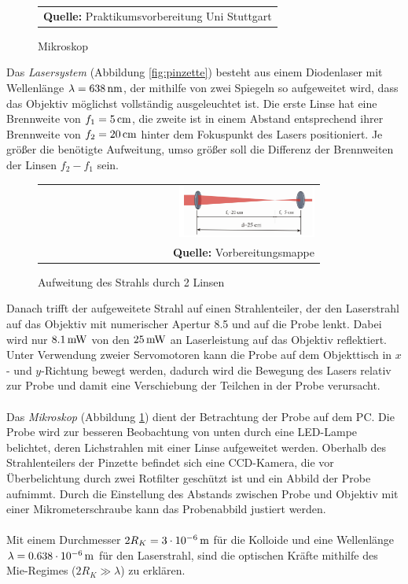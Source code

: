 \documentclass[a4paper,titlepage]{scrartcl}
\numberwithin{equation}{section}
\begin{document}
\begin{figure}[H]
\begin{minipage}{.5\textwidth}
\begin{tabular}{@{}r@{}}
\footnotesize\sffamily\textbf{Quelle:} Praktikumsvorbereitung Uni Stuttgart \cite{praktikum}
\end{tabular}
\caption{Mikroskop}
\label{fig:mikroskop}
\end{minipage}
\end{figure}
Das \emph{Lasersystem} (Abbildung \ref{fig:pinzette}) besteht aus einem Diodenlaser mit Wellenlänge $\lambda=\unit[638]{nm}$, der mithilfe von zwei Spiegeln so aufgeweitet wird, dass das Objektiv möglichst vollständig ausgeleuchtet ist. Die erste Linse hat eine Brennweite von $f_1=\unit[5]{cm}$, die zweite ist in einem Abstand entsprechend ihrer Brennweite von $f_2=\unit[20]{cm}$ hinter dem Fokuspunkt des Lasers positioniert. Je größer die benötigte Aufweitung, umso größer soll die Differenz der Brennweiten der Linsen $f_2-f_1$ sein.
\begin{figure}[H]
	\centering
	\begin{tabular}{@{}r@{}}
		\includegraphics[width=0.5\textwidth]{twolenses.PNG}\\
		\footnotesize\sffamily\textbf{Quelle:} Vorbereitungsmappe \cite{vorbereitungsmappe}
	\end{tabular}
	\caption{Aufweitung des Strahls durch 2 Linsen}
    \label{fig:twolenses}
\end{figure}
Danach trifft der aufgeweitete Strahl auf einen Strahlenteiler, der den Laserstrahl auf das Objektiv mit numerischer Apertur 8.5 und auf die Probe lenkt. Dabei wird nur $\unit[8.1]{mW}$ von den $\unit[25]{mW}$ an Laserleistung auf das Objektiv reflektiert. Unter Verwendung zweier Servomotoren kann die Probe auf dem Objekttisch in $x$- und $y$-Richtung bewegt werden, dadurch wird die Bewegung des Lasers relativ zur Probe und damit eine Verschiebung der Teilchen in der Probe verursacht.\\ \\
Das \emph{Mikroskop} (Abbildung \ref{fig:mikroskop}) dient der Betrachtung der Probe auf dem PC. Die Probe wird zur besseren Beobachtung von unten durch eine LED-Lampe belichtet, deren Lichstrahlen mit einer Linse aufgeweitet werden. Oberhalb des Strahlenteilers der Pinzette befindet sich eine CCD-Kamera, die vor Überbelichtung durch zwei Rotfilter geschützt ist und ein Abbild der Probe aufnimmt. Durch die Einstellung des Abstands zwischen Probe und Objektiv mit einer Mikrometerschraube kann das Probenabbild justiert werden.\\ \\
Mit einem Durchmesser $2R_K=\unit[3 \cdot 10^{-6}]{m}$ für die Kolloide und eine Wellenlänge $\lambda=\unit[0.638 \cdot 10^{-6}]{m}$ für den Laserstrahl, sind die optischen Kräfte mithilfe des Mie-Regimes ($2R_K \gg \lambda$) zu erklären.
\end{document}
